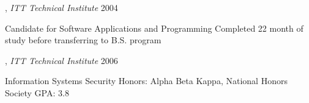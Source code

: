 , \textit{ITT Technical Institute} \hfill	2004


Candidate for Software Applications and Programming Completed 22 month of study before transferring to B.S. program 

, \textit{ITT Technical Institute}	\hfill 2006

Information Systems Security Honors: Alpha Beta Kappa, National Honors Society GPA: 3.8
